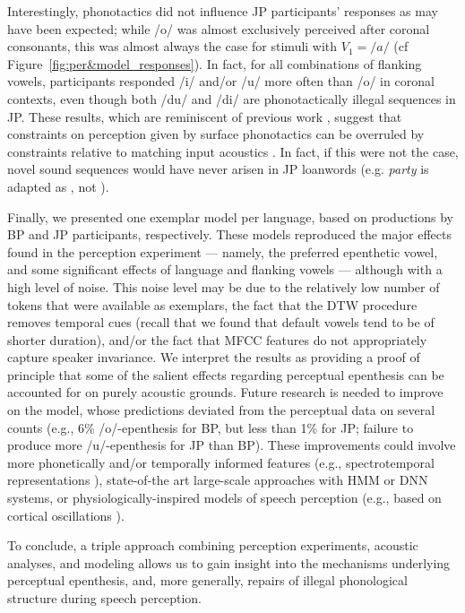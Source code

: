 Interestingly, phonotactics did not influence JP participants' responses as may have been expected; while /o/ was almost exclusively perceived after coronal consonants, this was almost always the case for stimuli with $V_{1} = /a/$ (cf Figure~\ref{fig:per&model_responses}). In fact, for all combinations of flanking vowels, participants responded /i/ and/or /u/ more often than /o/ in coronal contexts, even though both /du/ and /di/ are phonotactically illegal sequences in JP. These results, which are reminiscent of previous work \cite{monahan2009, mattingley2015}, suggest that constraints on perception given by surface phonotactics can be overruled by constraints relative to matching input acoustics \cite{dupoux_2011}. In fact, if this were not the case, novel sound sequences would have never arisen in JP loanwords (e.g. \textit{party} is adapted as , not ). 

Finally, we presented one exemplar model per language, based on productions by BP and JP participants, respectively. These models reproduced the major effects found in the perception experiment --- namely, the preferred epenthetic vowel, and some significant effects of language and flanking vowels --- although with a high level of noise. This noise level may be due to the relatively low number of tokens that were available as exemplars, the fact that the DTW procedure removes temporal cues (recall that we found that default vowels tend to be of shorter duration), and/or the fact that MFCC features do not appropriately capture speaker invariance.
We interpret the results as providing a proof of principle that some of the salient effects regarding perceptual epenthesis can be accounted for on purely acoustic grounds. Future research is needed to improve on the model, whose predictions deviated from the perceptual data on several counts (e.g., 6\% /o/-epenthesis for BP, but less than 1\% for JP; failure to produce more /u/-epenthesis for JP than BP). These improvements could involve more phonetically and/or temporally informed features (e.g., spectrotemporal representations \cite{chi2005}), state-of-the art large-scale approaches with HMM or DNN systems, or physiologically-inspired models of speech perception (e.g., based on cortical oscillations \cite{hyafil2015}).

To conclude, a triple approach combining perception experiments, acoustic analyses, and modeling allows us to gain insight into the mechanisms underlying perceptual epenthesis, and, more generally, repairs of illegal phonological structure during speech perception.


